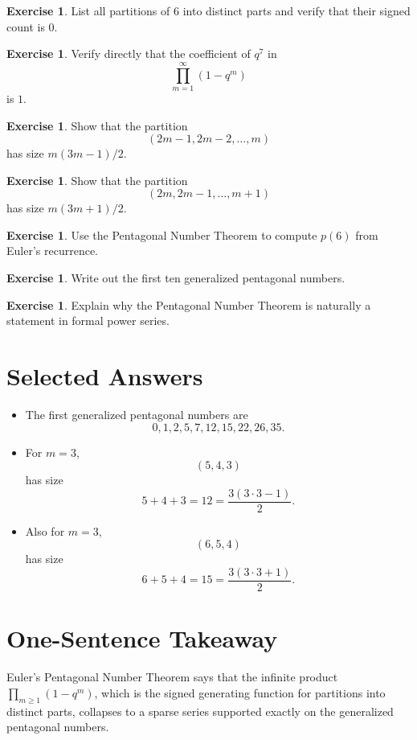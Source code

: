 \documentclass[11pt]{article}
\theoremstyle{definition}
\newtheorem{exercise}[theorem]{Exercise}
\theoremstyle{remark}
\begin{document}
	\begin{exercise}
		List all partitions of \(6\) into distinct parts and verify that their signed count is \(0\).
	\end{exercise}
	
	\begin{exercise}
		Verify directly that the coefficient of \(q^7\) in
		\[
		\prod_{m=1}^{\infty}(1-q^m)
		\]
		is \(1\).
	\end{exercise}
	
	\begin{exercise}
		Show that the partition
		\[
		(2m-1,2m-2,\dots,m)
		\]
		has size \(m(3m-1)/2\).
	\end{exercise}
	
	\begin{exercise}
		Show that the partition
		\[
		(2m,2m-1,\dots,m+1)
		\]
		has size \(m(3m+1)/2\).
	\end{exercise}
	
	\begin{exercise}
		Use the Pentagonal Number Theorem to compute \(p(6)\) from Euler's recurrence.
	\end{exercise}
	
	\begin{exercise}
		Write out the first ten generalized pentagonal numbers.
	\end{exercise}
	
	\begin{exercise}
		Explain why the Pentagonal Number Theorem is naturally a statement in formal power series.
	\end{exercise}
	
	\section{Selected Answers}
	
	\begin{itemize}
		\item The first generalized pentagonal numbers are
		\[
		0,1,2,5,7,12,15,22,26,35.
		\]
		
		\item For \(m=3\),
		\[
		(5,4,3)
		\]
		has size
		\[
		5+4+3=12=\frac{3(3\cdot 3-1)}{2}.
		\]
		
		\item Also for \(m=3\),
		\[
		(6,5,4)
		\]
		has size
		\[
		6+5+4=15=\frac{3(3\cdot 3+1)}{2}.
		\]
	\end{itemize}
	
	\section*{One-Sentence Takeaway}
	
	Euler's Pentagonal Number Theorem says that the infinite product \(\prod_{m\ge 1}(1-q^m)\), which is the signed generating function for partitions into distinct parts, collapses to a sparse series supported exactly on the generalized pentagonal numbers.
	
\end{document}
